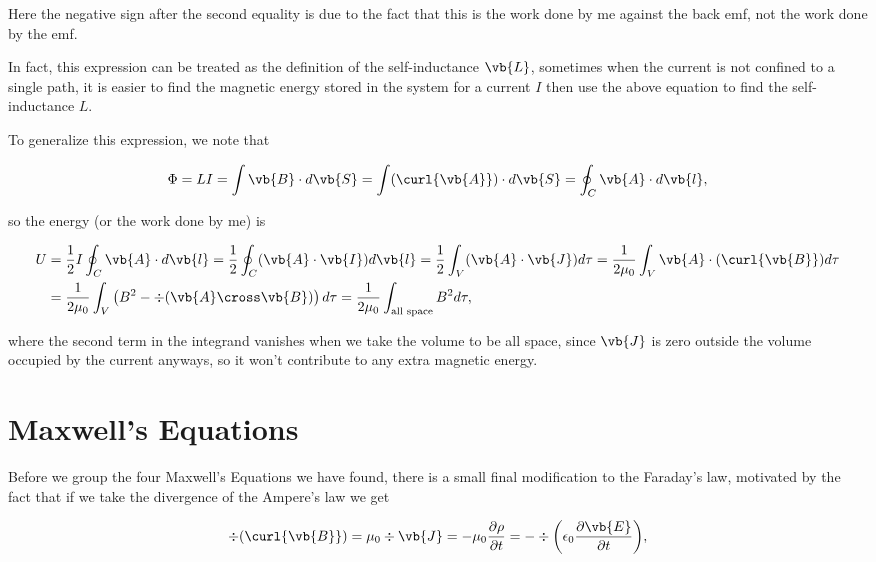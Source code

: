 \documentclass[english,a4paper,12pt]{report}
\begin{document}
Here the negative sign after the second equality is due to the fact that this is the work done by me against the back emf, not the work done by the emf.

In fact, this expression can be treated as the definition of the self-inductance \(\vb{L}\), sometimes when the current is not confined to a single path, it is easier to find the magnetic energy stored in the system for a current \(I\) then use the above equation to find the self-inductance \(L\).  

To generalize this expression, we note that 

\begin{equation}
    \Phi = LI = \int \vb{B} \cdot d\vb{S} = \int (\curl{\vb{A} } ) \cdot d\vb{S} = \oint_{C} \vb{A} \cdot d\vb{l},
\end{equation}

so the energy (or the work done by me) is 

\begin{equation}
    \begin{aligned} 
    U &= \frac{1}{2} I \oint_{C} \vb{A} \cdot d\vb{l}   = \frac{1}{2} \oint_{C} (\vb{A} \cdot \vb{I} )d\vb{l} = \frac{1}{2} \int_{V}^{} (\vb{A} \cdot \vb{J} )d\tau = \frac{1}{2\mu_0 } \int_{V}^{} \vb{A} \cdot (\curl{\vb{B} } )d\tau \\
    &= \frac{1}{2\mu_0 }\int_{V}^{} \left( B^2-\div{(\vb{A} \cross \vb{B} )}  \right) d\tau = \frac{1}{2\mu_0 } \int_{\text{all space} }^{} B^2d\tau ,    
    \end{aligned}   
\end{equation}

where the second term in the integrand vanishes when we take the volume to be all space, since \(\vb{J} \) is zero outside the volume occupied by the current anyways, so it won't contribute to any extra magnetic energy. 

\section{Maxwell's Equations}

Before we group the four Maxwell's Equations we have found, there is a small final modification to the Faraday's law, motivated by the fact that if we take the divergence of the Ampere's law we get

\begin{equation}
    \div{(\curl{\vb{B} } )} = \mu_0 \div{\vb{J} } = -\mu_0 \frac{\partial \rho }{\partial t} = -\div{\left( \epsilon_0 \frac{\partial \vb{E} }{\partial t}  \right)}, 
\end{equation}
\end{document}
